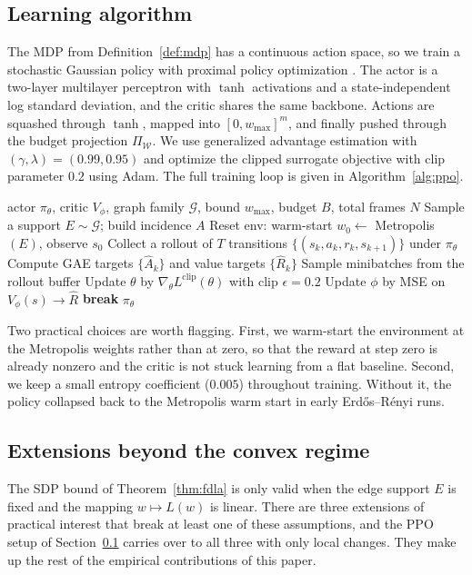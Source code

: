 \documentclass[letterpaper, 11 pt, journal, twoside]{IEEEtran}
\begin{document}
\subsection{Learning algorithm}
\label{sec:algo}
The MDP from Definition~\ref{def:mdp} has a continuous action space,
so we train a stochastic Gaussian policy with proximal policy
optimization \cite{Schulman2017}. The actor is a two-layer
multilayer perceptron with $\tanh$ activations and a
state-independent log standard deviation, and the critic shares the
same backbone. Actions are squashed through $\tanh$, mapped into
$[0, w_{\max}]^m$, and finally pushed through the budget projection
$\Pi_\mathcal{W}$. We use generalized advantage estimation
\cite{SchulmanGAE2016} with $(\gamma, \lambda) = (0.99, 0.95)$ and
optimize the clipped surrogate objective with clip parameter $0.2$
using Adam. The full training loop is given in
Algorithm~\ref{alg:ppo}.

\begin{algorithm}[t]
\caption{PPO for constrained $\lambda_2$ maximization}
\label{alg:ppo}
\begin{algorithmic}[1]
\Require actor $\pi_\theta$, critic $V_\phi$, graph family $\mathcal{G}$, bound $w_{\max}$, budget $B$, total frames $N$
  \State Sample a support $E \sim \mathcal{G}$; build incidence $A$
  \State Reset env: warm-start $w_0 \leftarrow$ Metropolis$(E)$, observe $s_0$
  \State Collect a rollout of $T$ transitions $\{(s_k, a_k, r_k, s_{k+1})\}$ under $\pi_\theta$
  \State Compute GAE targets $\{\hat A_k\}$ and value targets $\{\hat R_k\}$
    \State Sample minibatches from the rollout buffer
    \State Update $\theta$ by $\nabla_\theta L^{\text{clip}}(\theta)$ with clip $\epsilon{=}0.2$
    \State Update $\phi$ by MSE on $V_\phi(s) \to \hat R$
  \EndFor
   \textbf{break}
  \EndIf
\EndFor
\State \Return $\pi_\theta$
\end{algorithmic}
\end{algorithm}

Two practical choices are worth flagging. First, we warm-start the
environment at the Metropolis weights rather than at zero, so that
the reward at step zero is already nonzero and the critic is not
stuck learning from a flat baseline. Second, we keep a small entropy
coefficient ($0.005$) throughout training. Without it, the policy
collapsed back to the Metropolis warm start in early
Erd\H{o}s--R\'enyi runs.

\subsection{Extensions beyond the convex regime}
\label{sec:main-extensions}
The SDP bound of Theorem~\ref{thm:fdla} is only valid when the edge
support $E$ is fixed and the mapping $w \mapsto L(w)$ is linear.
There are three extensions of practical interest that break at least
one of these assumptions, and the PPO setup of
Section~\ref{sec:algo} carries over to all three with only local
changes. They make up the rest of the empirical contributions of
this paper.
\end{document}
